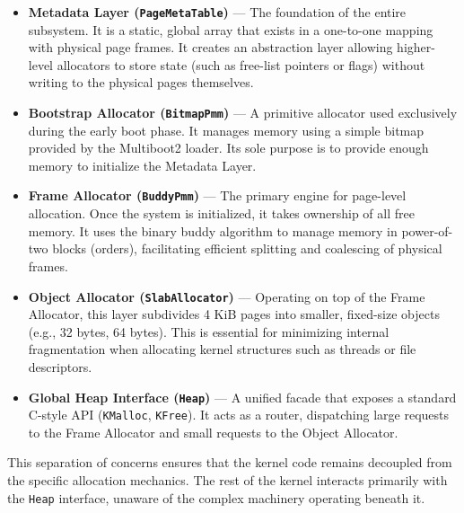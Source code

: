 \documentclass[a4paper,10pt,twoside]{report}
\theoremstyle{definition}
\begin{document}
\begin{itemize}
    \item \textbf{Metadata Layer (\texttt{PageMetaTable})} --- The foundation of the entire subsystem. It is a static, global array that exists in a one-to-one mapping with physical page frames. It creates an abstraction layer allowing higher-level allocators to store state (such as free-list pointers or flags) without writing to the physical pages themselves.
    
    \item \textbf{Bootstrap Allocator (\texttt{BitmapPmm})} --- A primitive allocator used exclusively during the early boot phase. It manages memory using a simple bitmap provided by the Multiboot2 loader. Its sole purpose is to provide enough memory to initialize the Metadata Layer.
    
    \item \textbf{Frame Allocator (\texttt{BuddyPmm})} --- The primary engine for page-level allocation. Once the system is initialized, it takes ownership of all free memory. It uses the binary buddy algorithm to manage memory in power-of-two blocks (orders), facilitating efficient splitting and coalescing of physical frames.
    
    \item \textbf{Object Allocator (\texttt{SlabAllocator})} --- Operating on top of the Frame Allocator, this layer subdivides 4 KiB pages into smaller, fixed-size objects (e.g., 32 bytes, 64 bytes). This is essential for minimizing internal fragmentation when allocating kernel structures such as threads or file descriptors.
    
    \item \textbf{Global Heap Interface (\texttt{Heap})} --- A unified facade that exposes a standard C-style API (\texttt{KMalloc}, \texttt{KFree}). It acts as a router, dispatching large requests to the Frame Allocator and small requests to the Object Allocator.
\end{itemize}

This separation of concerns ensures that the kernel code remains decoupled from the specific allocation mechanics. The rest of the kernel interacts primarily with the \texttt{Heap} interface, unaware of the complex machinery operating beneath it.
\end{document}
